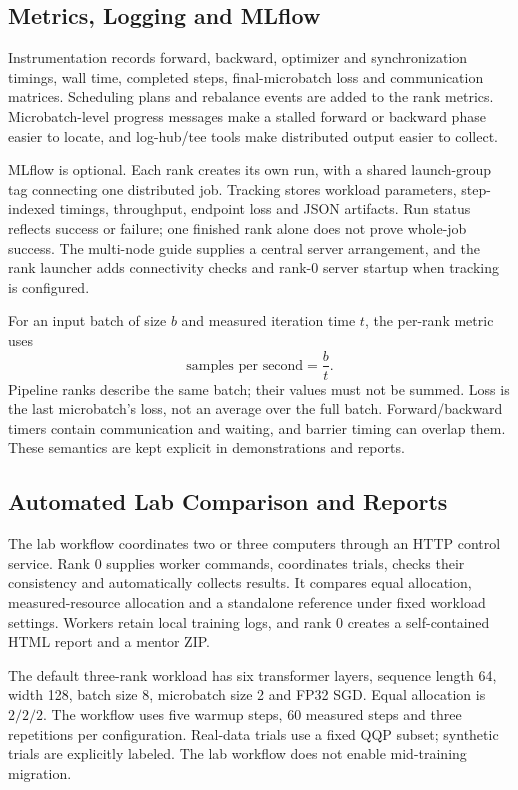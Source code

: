 \subsection{Metrics, Logging and MLflow}

Instrumentation records forward, backward, optimizer and synchronization timings, wall time, completed steps, final-microbatch loss and communication matrices. Scheduling plans and rebalance events are added to the rank metrics. Microbatch-level progress messages make a stalled forward or backward phase easier to locate, and log-hub/tee tools make distributed output easier to collect.

MLflow is optional. Each rank creates its own run, with a shared launch-group tag connecting one distributed job. Tracking stores workload parameters, step-indexed timings, throughput, endpoint loss and JSON artifacts. Run status reflects success or failure; one finished rank alone does not prove whole-job success. The multi-node guide supplies a central server arrangement, and the rank launcher adds connectivity checks and rank-0 server startup when tracking is configured.

For an input batch of size $b$ and measured iteration time $t$, the per-rank metric uses
\[
  \text{samples per second}=\frac{b}{t}.
\]
Pipeline ranks describe the same batch; their values must not be summed. Loss is the last microbatch's loss, not an average over the full batch. Forward/backward timers contain communication and waiting, and barrier timing can overlap them. These semantics are kept explicit in demonstrations and reports.

\subsection{Automated Lab Comparison and Reports}

The lab workflow coordinates two or three computers through an HTTP control service. Rank 0 supplies worker commands, coordinates trials, checks their consistency and automatically collects results. It compares equal allocation, measured-resource allocation and a standalone reference under fixed workload settings. Workers retain local training logs, and rank 0 creates a self-contained HTML report and a mentor ZIP.

The default three-rank workload has six transformer layers, sequence length 64, width 128, batch size 8, microbatch size 2 and FP32 SGD. Equal allocation is $2/2/2$. The workflow uses five warmup steps, 60 measured steps and three repetitions per configuration. Real-data trials use a fixed QQP subset; synthetic trials are explicitly labeled. The lab workflow does not enable mid-training migration.

